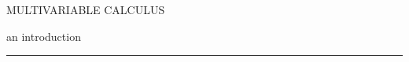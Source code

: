 \begin{titlepage} 
  \pagecolor{softblue}
  {\titlefont \color{MidnightBlue} MULTIVARIABLE CALCULUS} 
  
  \vspace*{5mm} 
  { \hspace*{11.5cm} \subtitlefont an introduction} \par
  \null\vfill
  \vspace*{1cm}
  \noindent
  \hfill
  \begin{minipage}{0.35\linewidth}
    \begin{flushright}
      \printauthor
    \end{flushright}
  \end{minipage}
  \begin{minipage}{0.02\linewidth}
    \rule{1pt}{125pt}
  \end{minipage}
  \titlepagedecoration
\end{titlepage}